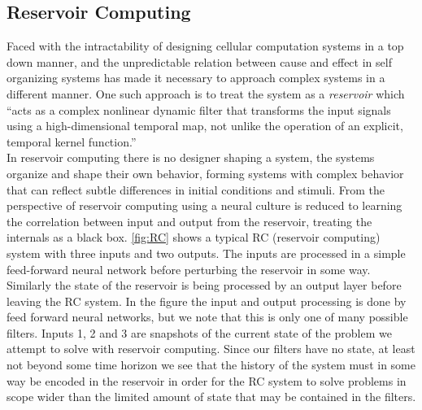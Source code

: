 \subsection{Reservoir Computing}
Faced with the intractability of designing cellular computation systems in a top
down manner, and the unpredictable relation between cause and effect in self organizing
systems has made it necessary to approach complex systems in a different manner.
One such approach is to treat the system as a \textit{reservoir}
\cite{schrauwen_overview_2007} which
``acts as a complex nonlinear dynamic filter that transforms the
input signals using a high-dimensional temporal map, not unlike the operation
of an explicit, temporal kernel function.''\\
In reservoir computing there is no designer shaping a system, the systems
organize and shape their own behavior, forming systems with complex behavior
that can reflect subtle differences in initial conditions and stimuli.
From the perspective of reservoir computing using a neural culture is reduced to
learning the correlation between input and output from the reservoir, treating
the internals as a black box.
\ref{fig:RC} shows a typical RC (reservoir computing) system with three inputs
and two outputs. The inputs are processed in a simple feed-forward neural
network before perturbing the reservoir in some way.
Similarly the state of the reservoir is being processed by an output layer
before leaving the RC system.
In the figure the input and output processing is done by feed forward neural
networks, but we note that this is only one of many possible filters.
Inputs 1, 2 and 3 are snapshots of the current state of the problem we attempt
to solve with reservoir computing.
Since our filters have no state, at least not beyond some time horizon we see
that the history of the system must in some way be encoded in the reservoir in
order for the RC system to solve problems in scope wider than the limited amount
of state that may be contained in the filters.
\begin{figure*}[h]
  
  \caption{An idealized reservoir computing system.
  The square boxes are simple filters, in this particular case represented by
  feed forward neural networks.
  The input processing and output layer are both trained with machine learning
  to process input and to interpret output from a reservoir in order to perform
  a specific task.
}
  \label{fig:RC}
\end{figure*}

